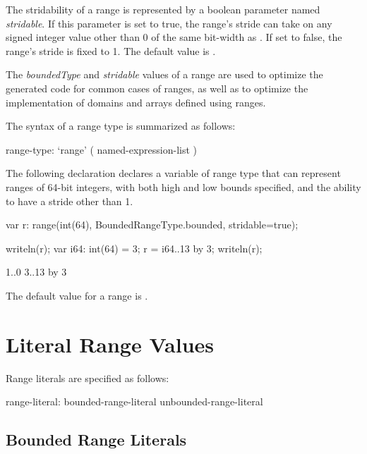 The stridability of a range is represented by a boolean parameter
named \emph{stridable}.  If this parameter is set to true, the range's
stride can take on any signed integer value other than 0 of the same
bit-width as .  If set to false, the range's stride is
fixed to 1.  The default value is .

\begin{rationale}
The \emph{boundedType} and \emph{stridable} values of a range are used
to optimize the generated code for common cases of ranges, as well as
to optimize the implementation of domains and arrays defined using
ranges.
\end{rationale}

The syntax of a range type is summarized as follows:
\begin{syntax}
range-type:
  `range' ( named-expression-list )
\end{syntax}

\begin{example}
The following declaration declares a variable 
of range type that can represent ranges of 64-bit integers, with both
high and low bounds specified, and the ability to have a stride other
than 1.
\begin{chapelpre}
\end{chapelpre}
\begin{chapel}
var r: range(int(64), BoundedRangeType.bounded, stridable=true);
\end{chapel}
\begin{chapelpost}
writeln(r);
var i64: int(64) = 3;
r = i64..13 by 3;
writeln(r);
\end{chapelpost}
\begin{chapeloutput}
1..0
3..13 by 3
\end{chapeloutput}
\end{example}

The default value for a range is .

\section{Literal Range Values}
\label{Range_Literals}

Range literals are specified as follows:
\begin{syntax}
range-literal:
  bounded-range-literal
  unbounded-range-literal
\end{syntax}

\subsection{Bounded Range Literals}
\label{Bounded_Ranges}

